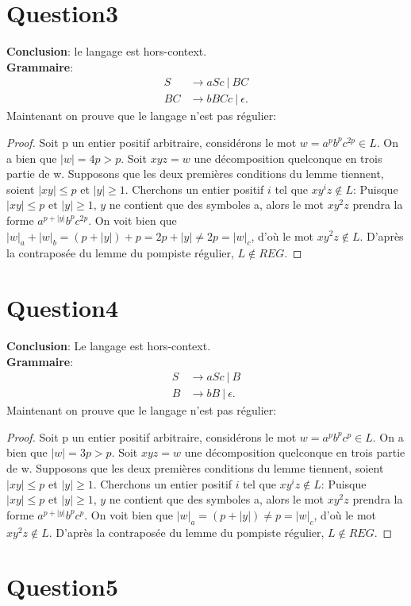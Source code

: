 \documentclass{article}
\begin{document}
\section*{Question3}
\textbf{Conclusion}: le langage est hors-context.\\
\textbf{Grammaire}:
\begin{align*}
	S &\to aSc\ |\ BC\\
	BC&\to bBCc\ |\ \epsilon
.\end{align*}
Maintenant on prouve que le langage n'est pas régulier:
\begin{proof}
	Soit p un entier positif arbitraire, considérons le mot $w = a^{p}b^{p}c^{2p} \in L$. On a bien que $ |w| = 4p > p$.
	Soit $xyz = w$ une décomposition quelconque en trois partie de w. Supposons que les deux premières conditions du lemme tiennent, soient $|xy| \le  p$ et $|y| \ge  1$. Cherchons un entier positif $i$ tel que $xy^{i}z \not\in L$: Puisque $ |xy| \le p \text{ et } |y| \ge 1$, $y$ ne contient que des symboles a, alors le mot $xy^{2}z$ prendra la forme $a^{p+ |y|}b^{p}c^{2p}$. On voit bien que $|w|_{a}+|w|_{b} = (p + |y|) + p = 2p + |y|\neq 2p =  |w|_{c}$, d'où le mot $xy^{2}z \not\in L$. D'après la contraposée du lemme du pompiste régulier, $L \not\in REG$.
\end{proof}
\section*{Question4}
\textbf{Conclusion}: Le langage est hors-context.\\
\textbf{Grammaire}:
\begin{align*}
	S &\to aSc\ |\ B\\
	B&\to bB\ |\ \epsilon
.\end{align*}
Maintenant on prouve que le langage n'est pas régulier:
\begin{proof}
	Soit p un entier positif arbitraire, considérons le mot $w = a^{p}b^{p}c^{p} \in L$. On a bien que $ |w| = 3p > p$.
	Soit $xyz = w$ une décomposition quelconque en trois partie de w. Supposons que les deux premières conditions du lemme tiennent, soient $|xy| \le  p$ et $|y| \ge  1$. Cherchons un entier positif $i$ tel que $xy^{i}z \not\in L$: Puisque $ |xy| \le p \text{ et } |y| \ge 1$, $y$ ne contient que des symboles a, alors le mot $xy^{2}z$ prendra la forme $a^{p+ |y|}b^{p}c^{p}$. On voit bien que $|w|_{a} = (p + |y|) \neq p = |w|_{c}$, d'où le mot $xy^{2}z \not\in L$. D'après la contraposée du lemme du pompiste régulier, $L \not\in REG$.
\end{proof}
\section*{Question5}
\end{document}
